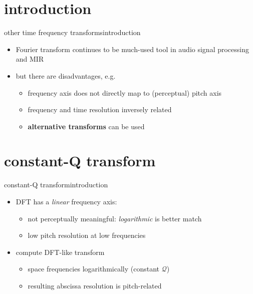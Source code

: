     \section[intro]{introduction}
        \begin{frame}{other time frequency transforms}{introduction}
            \begin{itemize}
                \item   Fourier transform continues to be much-used tool in audio signal processing and MIR
                \bigskip
                \item   but there are disadvantages, e.g.
                    \begin{itemize}
                        \item   frequency axis does not directly map to (perceptual) pitch axis
                        \item   frequency and time resolution inversely related
                        \smallskip
                        \item<2->[$\Rightarrow$] \textbf{alternative transforms} can be used
                    \end{itemize}
            \end{itemize}
        \end{frame}
        
    \section[CQT]{constant-Q transform}
        \begin{frame}{constant-Q transform}{introduction}
            \begin{itemize}
                \item<1-> DFT has a \textit{linear} frequency axis:
                    \begin{itemize}
                        \item	not perceptually meaningful: \textit{logarithmic} is better match
                        \item	low pitch resolution at low frequencies
                    \end{itemize}
                \bigskip
                \item<2->[$\Rightarrow$] compute DFT-like transform {\color{gtgold}{at specific frequencies}}
                    \begin{itemize}
                        \item   space frequencies logarithmically (constant $\mathcal{Q}$)
                        \item   resulting abscissa resolution is pitch-related
                    \end{itemize}
            \end{itemize}
            
            \bigskip
        \end{frame}	

